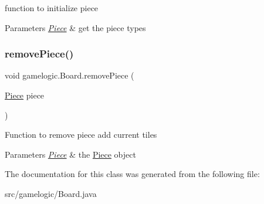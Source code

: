 function to initialize piece 
\begin{DoxyParams}{Parameters}
{\em \mbox{\hyperlink{classgamelogic_1_1_piece}{Piece}}} & get the piece types \\
\hline
\end{DoxyParams}
\mbox{\label{classgamelogic_1_1_board_ad538e51550a585d1465d76d92f3ddd10}} 
\subsubsection{\texorpdfstring{remove\+Piece()}{removePiece()}}
{\footnotesize\ttfamily void gamelogic.\+Board.\+remove\+Piece (\begin{DoxyParamCaption}\item[{\mbox{\hyperlink{classgamelogic_1_1_piece}{Piece}}}]{piece }\end{DoxyParamCaption})}

Function to remove piece add current tiles 
\begin{DoxyParams}{Parameters}
{\em \mbox{\hyperlink{classgamelogic_1_1_piece}{Piece}}} & the \mbox{\hyperlink{classgamelogic_1_1_piece}{Piece}} object \\
\hline
\end{DoxyParams}


The documentation for this class was generated from the following file\+:\begin{DoxyCompactItemize}
\item 
src/gamelogic/Board.\+java\end{DoxyCompactItemize}
